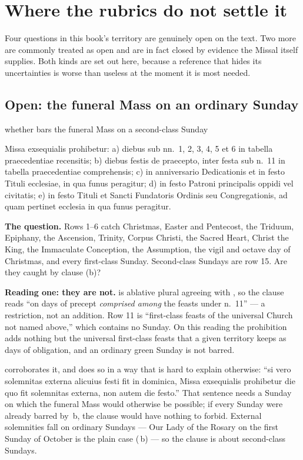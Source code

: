\section{Where the rubrics do not settle it}

Four questions in this book's territory are genuinely open on the text. Two
more are commonly treated as open and are in fact closed by evidence the
Missal itself supplies. Both kinds are set out here, because a reference that
hides its uncertainties is worse than useless at the moment it is most needed.

\subsection{Open: the funeral Mass on an ordinary Sunday}

\begin{contested}{whether  bars the funeral Mass on a second-class
Sunday}
\begin{rulebox}{}
Missa exsequialis prohibetur: a) diebus sub nn.~1, 2, 3, 4, 5 et 6 in tabella
praecedentiae recensitis; b) diebus festis de praecepto, inter festa sub n.~11
in tabella praecedentiae comprehensis; c) in anniversario Dedicationis et in
festo Tituli ecclesiae, in qua funus peragitur; d) in festo Patroni principalis
oppidi vel civitatis; e) in festo Tituli et Sancti Fundatoris Ordinis seu
Congregationis, ad quam pertinet ecclesia in qua funus peragitur.
\end{rulebox}

\textbf{The question.} Rows 1--6 catch Christmas, Easter and Pentecost, the
Triduum, Epiphany, the Ascension, Trinity, Corpus Christi, the Sacred Heart,
Christ the King, the Immaculate Conception, the Assumption, the vigil and
octave day of Christmas, and every first-class Sunday. Second-class Sundays are
row 15. Are they caught by clause (b)?

\textbf{Reading one: they are not.}  is ablative plural
agreeing with , so the clause reads ``on days
of precept \emph{comprised among} the feasts under n.~11'' --- a restriction,
not an addition. Row 11 is ``first-class feasts of the universal Church not
named above,'' which contains no Sunday. On this reading the prohibition adds
nothing but the universal first-class feasts that a given territory keeps as
days of obligation, and an ordinary green Sunday is not barred.

 corroborates it, and does so in a way that is hard to explain
otherwise: ``si vero solemnitas externa alicuius festi fit in dominica, Missa
exsequialis prohibetur die quo fit solemnitas externa, non autem die festo.''
That sentence needs a Sunday on which the funeral Mass would otherwise be
possible; if every Sunday were already barred by \,b, the clause would
have nothing to forbid. External solemnities  fall on ordinary
Sundays --- Our Lady of the Rosary on the first Sunday of October is the plain
case (\,b) --- so the clause is about second-class Sundays.


\end{contested}
